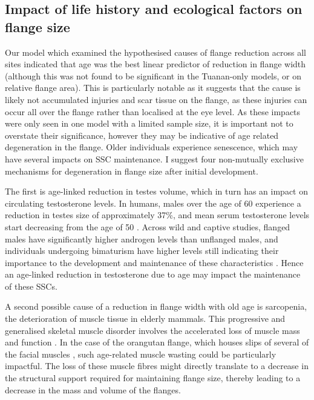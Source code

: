\subsection{Impact of life history and ecological factors on flange size}
Our model which examined the hypothesised causes of flange reduction across all sites indicated that age was the best linear predictor of reduction in flange width (although this was not found to be significant in the Tuanan-only models, or on relative flange area). This is particularly notable as it suggests that the cause is likely not accumulated injuries and scar tissue on the flange, as these injuries can occur all over the flange rather than localised at the eye level. As these impacts were only seen in one model with a limited sample size, it is important not to overstate their significance, however they may be indicative of age related degeneration in the flange. Older individuals experience senescence, which may have several impacts on SSC maintenance. I suggest four non-mutually exclusive mechanisms for degeneration in flange size after initial development.

The first is age-linked reduction in testes volume, which in turn has an impact on circulating testosterone levels. In humans, males over the age of 60 experience a reduction in testes size of approximately 37\%, and mean serum testosterone levels start decreasing from the age of 50 \citep{Stearns.1974}. Across wild and captive studies, flanged males have significantly higher androgen levels than unflanged males, and individuals undergoing bimaturism have higher levels still indicating their importance to the development and maintenance of these characteristics \citep{Marty.2015rzq, Prasetyo.2021}. Hence an age-linked reduction in testosterone due to age may impact the maintenance of these SSCs. 

A second possible cause of a reduction in flange width with old age is sarcopenia, the deterioration of muscle tissue in elderly mammals. This progressive and generalised skeletal muscle disorder involves the accelerated loss of muscle mass and function \citep{Evans.1993}. In the case of the orangutan flange, which houses slips of several of the facial muscles \citep{Straus.1942}, such age-related muscle wasting could be particularly impactful. The loss of these muscle fibres might directly translate to a decrease in the structural support required for maintaining flange size, thereby leading to a decrease in the mass and volume of the flanges.

